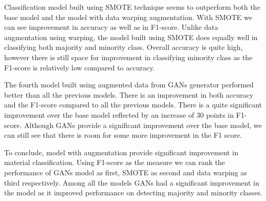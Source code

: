 Classification model built using SMOTE technique seems to outperform both the base model and the model with data warping augmentation. With SMOTE we can see improvement in accuracy as well as in F1-score. Unlike data augmentation using warping, the model built using SMOTE does equally well in classifying both majority and minority class. Overall accuracy is quite high, however there is still space for improvement in classifying minority class as the F1-score is relatively low compared to accuracy. 

The fourth model built using augmented data from GANs generator performed better than all the previous models. There is an improvement in both accuracy and the F1-score compared to all the previous models. There is a quite significant improvement over the base model reflected by an increase of 30 points in F1-score. Although GANs provide a significant improvement over the base model, we can still see that there is room for some more improvement in the F1 score. 

To conclude, model with augmentation provide significant improvement in material classification. Using F1-score as the measure we can rank the performance of GANs model as first, SMOTE as second and data warping as third respectively. Among all the models GANs had a significant improvement in the model as it improved performance on detecting majority and minority classes. 

